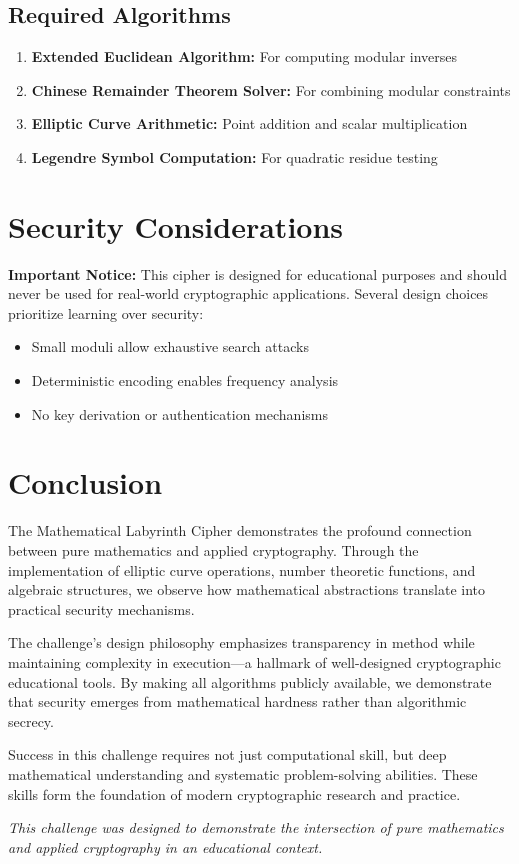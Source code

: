 \documentclass[11pt,a4paper]{article}
\begin{document}
\subsection{Required Algorithms}

\begin{enumerate}
    \item \textbf{Extended Euclidean Algorithm:} For computing modular inverses
    \item \textbf{Chinese Remainder Theorem Solver:} For combining modular constraints
    \item \textbf{Elliptic Curve Arithmetic:} Point addition and scalar multiplication
    \item \textbf{Legendre Symbol Computation:} For quadratic residue testing
\end{enumerate}

\section{Security Considerations}

\textbf{Important Notice:} This cipher is designed for educational purposes and should never be used for real-world cryptographic applications. Several design choices prioritize learning over security:

\begin{itemize}
    \item Small moduli allow exhaustive search attacks
    \item Deterministic encoding enables frequency analysis
    \item No key derivation or authentication mechanisms
\end{itemize}

\section{Conclusion}

The Mathematical Labyrinth Cipher demonstrates the profound connection between pure mathematics and applied cryptography. Through the implementation of elliptic curve operations, number theoretic functions, and algebraic structures, we observe how mathematical abstractions translate into practical security mechanisms.

The challenge's design philosophy emphasizes transparency in method while maintaining complexity in execution—a hallmark of well-designed cryptographic educational tools. By making all algorithms publicly available, we demonstrate that security emerges from mathematical hardness rather than algorithmic secrecy.

Success in this challenge requires not just computational skill, but deep mathematical understanding and systematic problem-solving abilities. These skills form the foundation of modern cryptographic research and practice.

\vspace{1cm}

\textit{This challenge was designed to demonstrate the intersection of pure mathematics and applied cryptography in an educational context.}
\end{document}
